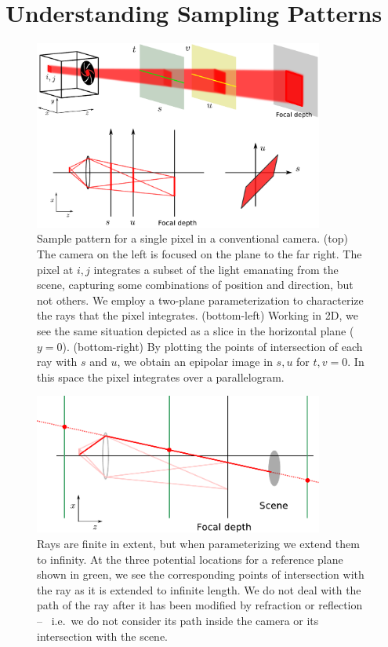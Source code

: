 \documentclass[onecolumn]{article}
\begin{document}
\section{Understanding Sampling Patterns}
\label{sect_FirstSomeBackground}

\begin{figure}
	\centering
	\includegraphics[width=0.85\textwidth]{Figs/Pixel4DParam}
	\caption{Sample pattern for a single pixel in a conventional camera. (top) The camera on the left is focused on the plane to the far right.  The pixel at $i,j$ integrates a subset of the light emanating from the scene, capturing some combinations of position and direction, but not others.  We employ a two-plane parameterization to characterize the rays that the pixel integrates.  (bottom-left) Working in 2D, we see the same situation depicted as a slice in the horizontal plane ($y=0$). (bottom-right) By plotting the points of intersection of each ray with $s$ and $u$, we obtain an epipolar image in $s,u$ for $t,v=0$.  In this space the pixel integrates over a parallelogram.}
	\label{fig_PixelParam2pp}
\end{figure}

\begin{figure}
	\centering
	\includegraphics[width=0.85\textwidth]{Figs/RayRepresentation_WorldSide}
	\caption{Rays are finite in extent, but when parameterizing we extend them to infinity.  At the three potential locations for a reference plane shown in green, we see the corresponding points of intersection with the ray as it is extended to infinite length.  We do not deal with the path of the ray after it has been modified by refraction or reflection --~ i.e.~we do not consider its path inside the camera or its intersection with the scene.}
	\label{fig_RayRepWorldSide}
\end{figure}
\end{document}
